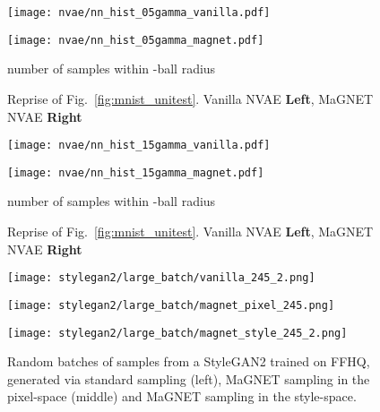 \begin{figure}[t!]
    \centering
    \begin{minipage}{0.04\linewidth}
    \end{minipage}
    \begin{minipage}{0.47\linewidth}
    \texttt{[image: nvae/nn\_hist\_05gamma\_vanilla.pdf]}
    \end{minipage}
    \begin{minipage}{0.47\linewidth}
    \texttt{[image: nvae/nn\_hist\_05gamma\_magnet.pdf]}
    \end{minipage}
    {\small number of samples within -ball radius}
    \caption{\small Reprise of Fig.~\ref{fig:mnist_unitest}.  Vanilla NVAE {\bf Left}, MaGNET NVAE {\bf Right} }
    \label{fig:mnist_unitest1}
\end{figure}


\begin{figure}[t!]
    \centering
    \begin{minipage}{0.04\linewidth}
    \end{minipage}
    \begin{minipage}{0.47\linewidth}
    \texttt{[image: nvae/nn\_hist\_15gamma\_vanilla.pdf]}
    \end{minipage}
    \begin{minipage}{0.47\linewidth}
    \texttt{[image: nvae/nn\_hist\_15gamma\_magnet.pdf]}
    \end{minipage}
    {\small number of samples within -ball radius}
    \caption{\small Reprise of Fig.~\ref{fig:mnist_unitest}. Vanilla NVAE {\bf Left}, MaGNET NVAE {\bf Right} }
    \label{fig:mnist_unitest2}
\end{figure}

\clearpage
\begin{figure}[h]
    \centering
    \begin{minipage}{0.3\linewidth}
    \texttt{[image: stylegan2/large\_batch/vanilla\_245\_2.png]}
    \end{minipage}
    \begin{minipage}{0.3\linewidth}
    \texttt{[image: stylegan2/large\_batch/magnet\_pixel\_245.png]}
    \end{minipage}
    \begin{minipage}{0.3\linewidth}
    \texttt{[image: stylegan2/large\_batch/magnet\_style\_245\_2.png]}
    \end{minipage}
    
    \caption{Random batches of  samples from a StyleGAN2 trained on FFHQ, generated via standard sampling (left), MaGNET sampling in the pixel-space (middle) and MaGNET sampling in the style-space.}
    \label{fig:styleganfull}
\end{figure}


